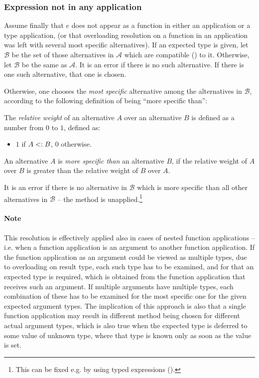 \subsubsection{Expression not in any application}
\label{sec:overloading-resolution-no-app}

Assume finally that $e$ does not appear as a function in either an application or a type application, (or that overloading resolution on a function in an application was left with several most specific alternatives). If an expected type is given, let $\mathcal{B}$ be the set of those alternatives in $\mathcal{A}$ which are compatible () to it. Otherwise, let $\mathcal{B}$ be the same as $\mathcal{A}$. It is an error if there is no such alternative. If there is one such alternative, that one is chosen. 

Otherwise, one chooses the {\em most specific} alternative among the alternatives in $\mathcal{B}$, according to the following definition of being ``more specific than'':

\begin{definition}
The {\em relative weight} of an alternative $A$ over an alternative $B$ is defined as a number from $0$ to $1$, defined as:
\begin{itemize}
\item $1$ if $A <: B$, $0$ otherwise.
\end{itemize}
\end{definition}

An alternative $A$ is {\em more specific than} an alternative $B$, if the relative weight of $A$ over $B$ is greater than the relative weight of $B$ over $A$. 

It is an error if there is no alternative in $\mathcal{B}$ which is more specific than all other alternatives in $\mathcal{B}$ -- the method is unapplied.\footnote{This can be fixed e.g. by using typed expressions ().}

\paragraph{Note}
This resolution is effectively applied also in cases of nested function applications -- i.e. when a function application is an argument to another function application. If the function application as an argument could be viewed as multiple types, due to overloading on result type, each such type has to be examined, and for that an expected type is required, which is obtained from the function application that receives such an argument. If multiple arguments have multiple types, each combination of these has to be examined for the most specific one for the given expected argument types. The implication of this approach is also that a single function application may result in different method being chosen for different actual argument types, which is also true when the expected type is deferred to some value of unknown type, where that type is known only as soon as the value is set.

